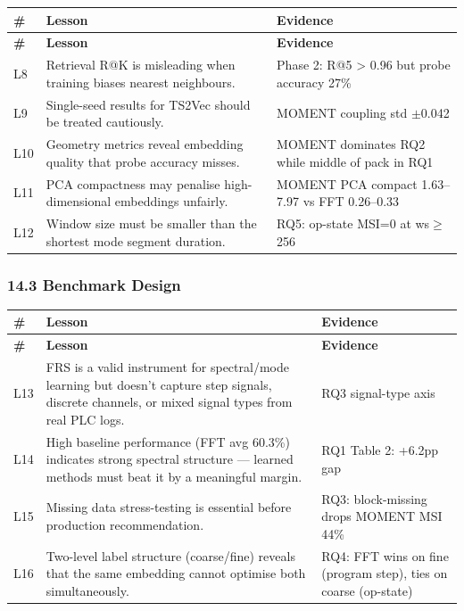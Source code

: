 \documentclass[11pt,a4paper]{article}
\begin{document}
\begin{longtable}{|l|l|l|}
\hline
\textbf{\#} & \textbf{Lesson} & \textbf{Evidence} \\
\hline
\endfirsthead
\hline
\textbf{\#} & \textbf{Lesson} & \textbf{Evidence} \\
\hline
\endhead
\hline
\endfoot
L8 & Retrieval R@K is misleading when training biases nearest neighbours. & Phase 2: R@5 > 0.96 but probe accuracy 27\% \\
\hline
L9 & Single-seed results for TS2Vec should be treated cautiously. & MOMENT coupling std $\pm$0.042 \\
\hline
L10 & Geometry metrics reveal embedding quality that probe accuracy misses. & MOMENT dominates RQ2 while middle of pack in RQ1 \\
\hline
L11 & PCA compactness may penalise high-dimensional embeddings unfairly. & MOMENT PCA compact 1.63--7.97 vs FFT 0.26--0.33 \\
\hline
L12 & Window size must be smaller than the shortest mode segment duration. & RQ5: op-state MSI=0 at ws$\geq$256 \\
\hline
\end{longtable}

\subsubsection{14.3 Benchmark Design}

\begin{longtable}{|l|l|l|}
\hline
\textbf{\#} & \textbf{Lesson} & \textbf{Evidence} \\
\hline
\endfirsthead
\hline
\textbf{\#} & \textbf{Lesson} & \textbf{Evidence} \\
\hline
\endhead
\hline
\endfoot
L13 & FRS is a valid instrument for spectral/mode learning but doesn't capture step signals, discrete channels, or mixed signal types from real PLC logs. & RQ3 signal-type axis \\
\hline
L14 & High baseline performance (FFT avg 60.3\%) indicates strong spectral structure --- learned methods must beat it by a meaningful margin. & RQ1 Table 2: +6.2pp gap \\
\hline
L15 & Missing data stress-testing is essential before production recommendation. & RQ3: block-missing drops MOMENT MSI 44\% \\
\hline
L16 & Two-level label structure (coarse/fine) reveals that the same embedding cannot optimise both simultaneously. & RQ4: FFT wins on fine (program step), ties on coarse (op-state) \\
\hline
\end{longtable}
\end{document}
